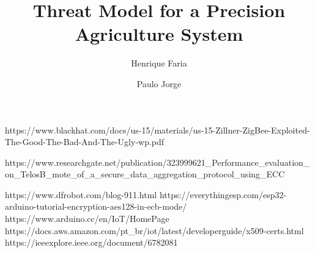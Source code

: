 \documentclass[runningheads]{llncs}
\title{Threat Model for a Precision Agriculture System}
\author{Henrique Faria \and Paulo Jorge}
\institute{Departamento de Informática, Universidade do Minho}
\begin{document}
 

\maketitle

\newpage
\hfill





\begin{thebibliography}{8}

 {https://www.blackhat.com/docs/us-15/materials/us-15-Zillner-ZigBee-Exploited-The-Good-The-Bad-And-The-Ugly-wp.pdf}

 {https://www.researchgate.net/publication/323999621\_Performance\_evaluation\_on\_TelosB\_mote\_of\_a\_secure\_data\_aggregation\_protocol\_using\_ECC}

 {https://www.dfrobot.com/blog-911.html}
 {https://everythingesp.com/esp32-arduino-tutorial-encryption-aes128-in-ecb-mode/}
 {https://www.arduino.cc/en/IoT/HomePage}
 {https://docs.aws.amazon.com/pt\_br/iot/latest/developerguide/x509-certs.html}
 {https://ieeexplore.ieee.org/document/6782081}
 {}
\end{thebibliography}
\end{document}
